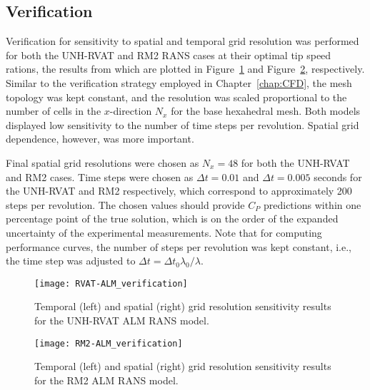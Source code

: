 \subsection{Verification}

Verification for sensitivity to spatial and temporal grid resolution was
performed for both the UNH-RVAT and RM2 RANS cases at their optimal tip speed
rations, the results from which are plotted in
Figure~\ref{fig:RVAT-ALM-verification} and
Figure~\ref{fig:RM2-ALM-verification}, respectively. Similar to the verification
strategy employed in Chapter~\ref{chap:CFD}, the mesh topology was kept
constant, and the resolution was scaled proportional to the number of cells in
the $x$-direction $N_x$ for the base hexahedral mesh. Both models displayed low
sensitivity to the number of time steps per revolution. Spatial grid dependence,
however, was more important.

Final spatial grid resolutions were chosen as $N_x=48$ for both the UNH-RVAT and
RM2 cases. Time steps were chosen as $\Delta t = 0.01$ and $\Delta t = 0.005$
seconds for the UNH-RVAT and RM2 respectively, which correspond to approximately
200 steps per revolution. The chosen values should provide $C_P$ predictions
within one percentage point of the true solution, which is on the order of the
expanded uncertainty of the experimental measurements. Note that for computing
performance curves, the number of steps per revolution was kept constant, i.e.,
the time step was adjusted to $\Delta t = \Delta t_0 \lambda_0 / \lambda$.

\begin{figure}
    \centering
    
    \texttt{[image: RVAT-ALM\_verification]}
    
    \caption{Temporal (left) and spatial (right) grid resolution sensitivity
        results for the UNH-RVAT ALM RANS model.}
    
    \label{fig:RVAT-ALM-verification}
\end{figure}

\begin{figure}
    \centering
    
    \texttt{[image: RM2-ALM\_verification]}
    
    \caption{Temporal (left) and spatial (right) grid resolution sensitivity
        results for the RM2 ALM RANS model.}
    
    \label{fig:RM2-ALM-verification}
\end{figure}


